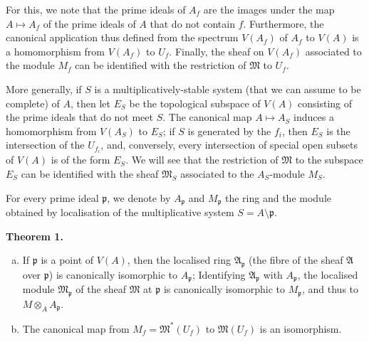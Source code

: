 \documentclass{article}
\newenvironment{itenv}[1]
  {\phantomsection\par\medskip\noindent\textbf{#1.}\itshape}
  {\medskip}
\newcommand{\oldpage}[1]{\marginpar{\footnotesize$\Big\vert$ \textit{p.~#1}}}
\begin{document}
For this, we note that the prime ideals of $A_f$ are the images under the map $A\mapsto A_f$ of the prime ideals of $A$ that do not contain $f$.
Furthermore, the canonical application thus defined from the spectrum $V(A_f)$ of $A_f$ to $V(A)$ is a homomorphism from $V(A_f)$ to $U_f$.
Finally, the sheaf on $V(A_f)$ associated to the module $M_f$ can be identified with the restriction of $\mathfrak{M}$ to $U_f$.

More generally, if $S$ is a multiplicatively-stable system (that we can assume to be complete) of $A$, then let $E_S$ be the topological subspace of $V(A)$ consisting of the prime ideals that do not meet $S$.
The canonical map $A\mapsto A_S$ induces a homomorphism from $V(A_S)$ to $E_S$;
if $S$ is generated by the $f_i$,
\oldpage{1-05}
then $E_S$ is the intersection of the $U_{f_i}$, and, conversely, every intersection of special open subsets of $V(A)$ is of the form $E_S$.
We will see that the restriction of $\mathfrak{M}$ to the subspace $E_S$ can be identified with the sheaf $\mathfrak{M}_S$ associated to the $A_S$-module $M_S$.

For every prime ideal $\mathfrak{p}$, we denote by $A_\mathfrak{p}$ and $M_\mathfrak{p}$ the ring and the module obtained by localisation of the multiplicative system $S=A\setminus\mathfrak{p}$.

\begin{itenv}{Theorem 1}
\label{theroem1}
  \begin{enumerate}[(a)]
    \item If $\mathfrak{p}$ is a point of $V(A)$, then the localised ring $\mathfrak{A}_\mathfrak{p}$ (the fibre of the sheaf $\mathfrak{A}$ over $\mathfrak{p}$) is canonically isomorphic to $A_\mathfrak{p}$;
      Identifying $\mathfrak{A}_\mathfrak{p}$ with $A_\mathfrak{p}$, the localised module $\mathfrak{M}_\mathfrak{p}$ of the sheaf $\mathfrak{M}$ at $\mathfrak{p}$ is canonically isomorphic to $M_\mathfrak{p}$, and thus to $M\otimes_A A_\mathfrak{p}$.
    \item The canonical map from $M_f=\mathfrak{M}^*(U_f)$ to $\mathfrak{M}(U_f)$ is an isomorphism.
  \end{enumerate}
\end{itenv}
\end{document}
